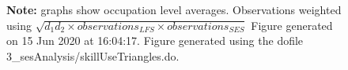 \begin{figure}[!h]
\par \begin{minipage}[h]{\textwidth}{\scriptsize\textbf{Note:} graphs show occupation level averages. Observations weighted using $ \sqrt{d_1d_2 \times observations_{LFS} \times observations_{SES} }$ Figure generated on 15 Jun 2020 at 16:04:17. Figure generated using the dofile 3\_sesAnalysis/skillUseTriangles.do.}\end{minipage}
\end{figure}
